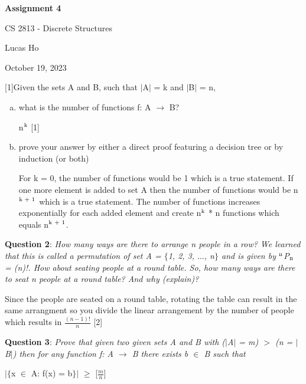 \documentclass{article} %
\newcommand{\question}[2][]{\begin{flushleft}
        \textbf{Question #1}: \textit{#2}

\end{flushleft}}
\newcommand{\maketitletwo}[2][]{\begin{center}
        \Large{\textbf{Assignment 4}
            
            CS 2813 - Discrete Structures} %
        \vspace{5pt}
        
        \normalsize{Lucas Ho  %
        
        October 19, 2023}        %
        \vspace{15pt}
        
\end{center}}
\begin{document}
    \maketitletwo[5]  %
    
    \question[1]{Given the sets A and B, such that $\mid$A$\mid$ = k and $\mid$B$\mid$ = n,}

    \begin{enumerate}[(a)]
      \item {what is the number of functions f: A $\rightarrow$ B?}
      
      n$\textsuperscript{k}$ [1]

      
      \item {prove your answer by either a direct proof featuring a decision tree or by induction (or both)}
      
      For k = 0, the number of functions would be 1 which is a true statement. If one more element is added to set A then the number of functions would be n$\textsuperscript{k + 1}$ which is a true statement. The number of functions increases exponentially for each added element and create n$\textsuperscript{k}$ * n functions which equals n$\textsuperscript{k + 1}$.
    \end{enumerate}

    \question[2]{How many ways are there to arrange n people in a row? We learned that this is called a permutation of set A = $\{$1, 2, 3, $\dots$, n$\}$ and is given by $\textsuperscript{n}$P$\textsubscript{n}$ = (n)!. How about seating people at a
    round table. So, how many ways are there to seat n people at a round table? And why (explain)?}

    Since the people are seated on a round table, rotating the table can result in the same arrangment so you divide the linear arrangement by the number of people which results in $\frac{(n-1)!}{n}$ [2]

    \question[3]{Prove that given two given sets A and B with ($\mid$A$\mid$ = m) $>$ (n = $\mid$B$\mid$) then for any function f: A $\rightarrow$ B there exists b $\in$ B such that}
    \begin{center}
        $\mid$$\{$x $\in$ A: f(x) = b$\}$$\mid$ $\geq$ [$\frac{m}{n}$]
    \end{center}
\end{document}

